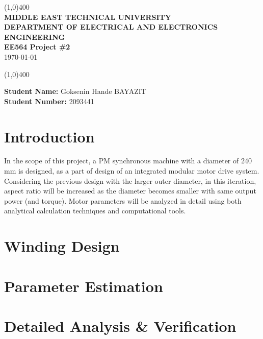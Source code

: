\documentclass[oneside,12pt]{article}
\begin{document}
\vfill
\begin{titlepage}
\begin{center}
\line(1,0){400}\\
\vspace{2cm}
\LARGE\textbf{MIDDLE EAST TECHNICAL UNIVERSITY}\\
\vspace{0.5cm}
\LARGE\textbf{DEPARTMENT OF ELECTRICAL AND ELECTRONICS ENGINEERING}\\ 

\vspace{1.5cm}
\LARGE\textbf{EE564 Project \#2}\\
\vspace{0.5cm}
\today\\
\vspace{2cm}

\line(1,0){400}\\
\vspace{0.5cm}

\end{center}

\vspace{3cm}
\begin{flushleft}
\LARGE\textbf {Student Name:} Goksenin Hande BAYAZIT\\
\LARGE\textbf {Student Number:} 2093441\\
\end{flushleft}
\end{titlepage}
\newpage
{}

\section{Introduction}

In the scope of this project, a PM synchronous machine with a diameter of 240 mm is designed, as a part of design of an integrated modular motor drive system. Considering the previous design with the larger outer diameter, in this iteration, aspect ratio will be increased as the diameter becomes smaller with same output power (and torque). Motor parameters will be analyzed in detail using both analytical calculation techniques and computational tools.


\section{Winding Design}



\section{Parameter Estimation}

\section{Detailed Analysis & Verification}
\end{document}
